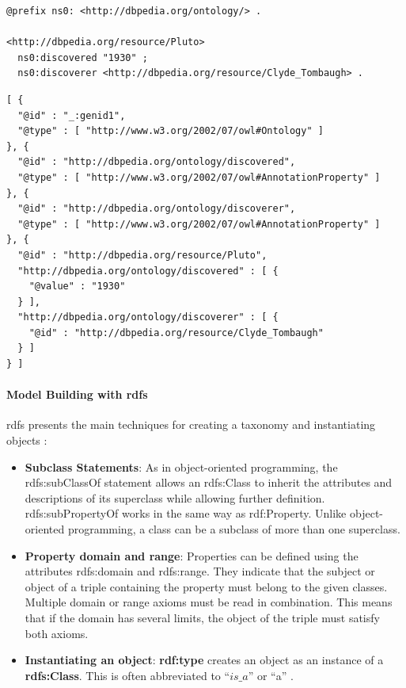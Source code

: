                 \begin{lstlisting}[caption=Example of RDF Serialization in Turtle, label={lst:rdf-turtle}]
@prefix ns0: <http://dbpedia.org/ontology/> .

<http://dbpedia.org/resource/Pluto>
  ns0:discovered "1930" ;
  ns0:discoverer <http://dbpedia.org/resource/Clyde_Tombaugh> .
                \end{lstlisting}

                \begin{lstlisting}[caption=Example of RDF Serialization in JSON-LD, label={lst:rdf-json-ld}]
[ {
  "@id" : "_:genid1",
  "@type" : [ "http://www.w3.org/2002/07/owl#Ontology" ]
}, {
  "@id" : "http://dbpedia.org/ontology/discovered",
  "@type" : [ "http://www.w3.org/2002/07/owl#AnnotationProperty" ]
}, {
  "@id" : "http://dbpedia.org/ontology/discoverer",
  "@type" : [ "http://www.w3.org/2002/07/owl#AnnotationProperty" ]
}, {
  "@id" : "http://dbpedia.org/resource/Pluto",
  "http://dbpedia.org/ontology/discovered" : [ {
    "@value" : "1930"
  } ],
  "http://dbpedia.org/ontology/discoverer" : [ {
    "@id" : "http://dbpedia.org/resource/Clyde_Tombaugh"
  } ]
} ]
                \end{lstlisting}

                
        
        
            \paragraph{Model Building with \acrshort{rdfs}}
            \acrfull{rdfs} presents the main techniques for creating a taxonomy and instantiating objects \cite{spelten2023simulation} : 

            \begin{itemize}
                \item \textbf{Subclass Statements}: As in object-oriented programming, the rdfs:subClassOf statement allows an rdfs:Class to inherit the attributes and descriptions of its superclass while allowing further definition. rdfs:subPropertyOf works in the same way as rdf:Property. Unlike object-oriented programming, a class can be a subclass of more than one superclass. 
                \item \textbf{Property domain and range}: Properties can be defined using the attributes rdfs:domain and rdfs:range. They indicate that the subject or object of a triple containing the property must belong to the given classes. Multiple domain or range axioms must be read in combination. This means that if the domain has several limits, the object of the triple must satisfy both axioms. 
                \item \textbf{Instantiating an object}: \textbf{rdf:type} creates an object as an instance of a \textbf{rdfs:Class}. This is often abbreviated to “$is\_a$” or “a” \cite{li2005ontology}.
            \end{itemize}
    
